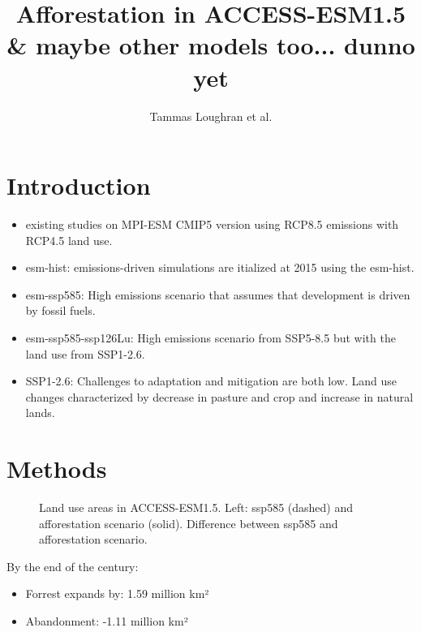 \documentclass[]{article}
\title{Afforestation in ACCESS-ESM1.5 \& maybe other models too... dunno yet}
\author{Tammas Loughran et al.}
\begin{document}
\maketitle

\section{Introduction}

\begin{itemize}
    \item existing studies on MPI-ESM CMIP5 version using RCP8.5 emissions with RCP4.5 land use. \cite{sonntag_reforestation_2016} \cite{sonntag_quantifying_2018}

    \item esm-hist: emissions-driven simulations are itialized at 2015 using the esm-hist. \cite{eyring_overview_2016}
    \item esm-ssp585: High emissions scenario that assumes that development is driven by fossil fuels. \cite{oneill_scenario_2016}
    \item esm-ssp585-ssp126Lu: High emissions scenario from SSP5-8.5 but with the land use from SSP1-2.6. \cite{lawrence_land_2016}
    \item SSP1-2.6: Challenges to adaptation and mitigation are both low. Land use changes characterized by decrease in pasture and crop and increase in natural lands. \cite{van_vuuren_energy_2017}
\end{itemize}

\section{Methods}

\begin{figure}[!h]
    \centering
    \begin{subfigure}[b]{0.45\linewidth}
        
    \end{subfigure}
    \begin{subfigure}[b]{0.45\linewidth}
        
    \end{subfigure}
    \caption{Land use areas in ACCESS-ESM1.5. Left: ssp585 (dashed) and afforestation scenario (solid). Difference between ssp585 and afforestation scenario.}
    \label{fig:land_use}
\end{figure}

By the end of the century:
\begin{itemize}
    \item Forrest expands by: 1.59 million km²
    \item Abandonment: -1.11 million km²
\end{itemize}
\end{document}
